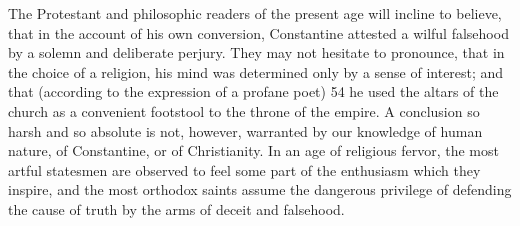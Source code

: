 The Protestant and philosophic readers of the present age will incline
to believe, that in the account of his own conversion, Constantine
attested a wilful falsehood by a solemn and deliberate perjury. They
may not hesitate to pronounce, that in the choice of a religion, his
mind was determined only by a sense of interest; and that (according to
the expression of a profane poet) 54 he used the altars of the church
as a convenient footstool to the throne of the empire. A conclusion so
harsh and so absolute is not, however, warranted by our knowledge of
human nature, of Constantine, or of Christianity. In an age of
religious fervor, the most artful statesmen are observed to feel some
part of the enthusiasm which they inspire, and the most orthodox saints
assume the dangerous privilege of defending the cause of truth by the
arms of deceit and falsehood.

